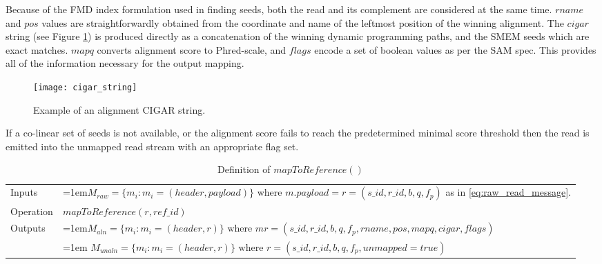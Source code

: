 Because of the FMD index formulation used in finding seeds, both the read and its complement are considered at the same time. $rname$ and $pos$ values are straightforwardly obtained from the coordinate and name of the leftmost position of the winning alignment. The $cigar$ string (see Figure \ref{fig:main_body_cigar_string}) is produced directly as a concatenation of the winning dynamic programming paths, and the SMEM seeds which are exact matches. $mapq$ converts alignment score to Phred-scale, and $flags$ encode a set of boolean values as per the SAM spec. This provides all of the information necessary for the output mapping.

\begin{figure}[H]
    \texttt{[image: cigar\_string]}
    \centering
    \caption {Example of an alignment CIGAR string.}
    \label{fig:main_body_cigar_string}
\end{figure}

If a co-linear set of seeds is not available, or the alignment score fails to reach the predetermined minimal score threshold then the read is emitted into the unmapped read stream with an appropriate flag set.

\bgroup
\def\arraystretch{1.5}
\begin{table}[!ht]
    \caption{Definition of $mapToReference()$}
    \label{tab:op_map_read_to_reference}
    {\begin{tabular}{l|p{12cm}}
    \toprule
    Inputs & \hangindent=1em$M_{raw} = \{m_i: m_i = (header, payload)\}$ where $m.payload = r = (s\_id, r\_id, b, q, f_p)$ as in \ref{eq:raw_read_message}. \\
    \cline{2-2}
    Operation & $mapToReference(r, ref\_id)$\\
    \cline{2-2}
    \multirow{2}{*}{Outputs} & \hangindent=1em$M_{aln} = \{m_i: m_i = (header, r)\} \text{ where } mr = (s\_id, r\_id, b, q, f_p, rname, pos, mapq, cigar, flags)$\\
    & \hangindent=1em $M_{unaln} = \{m_i: m_i = (header, r)\} \text{  where } r = (s\_id, r\_id, b, q, f_p, unmapped=true)$\\
    \bottomrule
    \end{tabular}}
\end{table}
\egroup


